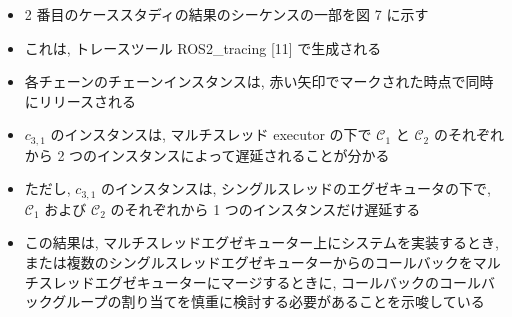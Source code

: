\begin{frame}{}
    \begin{itemize}
        \item 2 番目のケーススタディの結果のシーケンスの一部を図 7 に示す
\item これは, トレースツール ROS2\_tracing [11] で生成される
\item 各チェーンのチェーンインスタンスは, 赤い矢印でマークされた時点で同時にリリースされる
\item $c_{3,1}$ のインスタンスは, マルチスレッド executor の下で $\mathcal{C}_{1}$ と $\mathcal{C}_{2}$ のそれぞれから 2 つのインスタンスによって遅延されることが分かる
\item ただし, $c_{3,1}$ のインスタンスは, シングルスレッドのエグゼキュータの下で, $\mathcal{C}_{1}$ および $\mathcal{C}_{2}$ のそれぞれから 1 つのインスタンスだけ遅延する
\item この結果は, マルチスレッドエグゼキューター上にシステムを実装するとき, または複数のシングルスレッドエグゼキューターからのコールバックをマルチスレッドエグゼキューターにマージするときに, コールバックのコールバックグループの割り当てを慎重に検討する必要があることを示唆している
    \end{itemize}
\end{frame}
